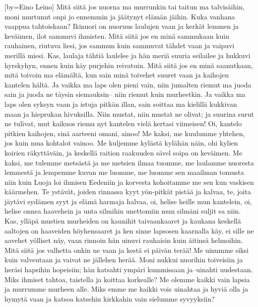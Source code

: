 [by=Eino Leino]
\beginverse
Mitä siitä jos nuorna ma murrunkin
tai taitun ma talvisäihin,
moni murtunut onpi jo ennemmin
ja jäätynyt elämän jäihin.
Kuka vanhana vaappua tahtoiskaan?
Ikinuori on nuoruus laulujen vaan
ja kerkät lemmen ja keväimen,
ilot sammuvi ihmisten.
\endverse
\beginverse
Mitä siitä jos en minä sammukaan
kuin rauhainen, riutuva liesi,
jos sammun kuin sammuvat tähdet vaan
ja vaipuvi merillä miesi.
Kas, laulaja tähtiä laulelee
ja hän meriä suuria seilailee
ja hukkuvi hyrskyhyn, ennen kuin
käy purjehin reivatuin.
\endverse
\beginverse
Mitä siitä jos en minä saanutkaan,
mitä toivoin ma elämältä,
kun sain minä toivehet suuret vaan
ja kaihojen kantelen hältä.
Ja vaikka ma laps olen pieni vain,
niin jumalten riemut ma juoda sain
ja juoda ne täysin siemauksin--
niin riemut kuin murheetkin.
\endverse
\beginverse
Ja vaikka ma laps olen syksyn vaan
ja istuja pitkän illan,
sain soittaa ma kielillä kukkivan maan
ja hieprukan hivuksilla.
Niin mustat, niin mustat ne olivat;
ja suurina surut ne tulivat,
mut kaikuos riemu nyt kantelen
vielä kertasi viimeisen!
\endverse
\beginverse
Oi, kantelo pitkien kaihojen,
sinä aarteeni omani, ainoo!
Me kaksi, me kuulumme yhtehen,
jos kuin mua kohtalot vainoo.
Me kuljemme kylästä kylähän näin,
ohi kylien koirien räkyttäväin,
ja keskellä raition raakuuden
sävel soipa on keväimen.
\endverse
\beginverse
Me kaksi, me tulemme metsästä
ja me metsien ilmaa tuomme,
me laulamme nuoresta lemmestä
ja lempemme kuvan me luomme,
me luomme sen maailman tomusta niin
kuin Luoja loi ihmisen Eedeniin
ja korvesta kohoitamme me sen
kun vaskisen käärmehen.
\endverse
\beginverse
Te ystävät, joiden rinnassa kyyt
yön-pitkät pistää ja kalvaa,
te, joita jäytävi sydämen syyt
ja elämä harmaja halvaa,
oi, helise heille mun kantelein,
oi, helise onnea haavehein
ja unta silmihin unettomiin
mun silmäni suljit sa niin.
Kas, ylläpä mustien murheiden
on kaunihit taivaankaaret
ja kaukana keskellä aaltojen
on haaveiden höyhensaaret
ja ken sinne lapsosen kaarnalla käy,
ei sille ne aavehet yölliset näy,
vaan rinnoin hän uinuvi rauhaisin
kuin äitinsä helmoihin.
\endverse
\beginverse
Mitä siitä jos valhetta onkin ne vaan
ja kestä ei päivän terää!
Me uinumme siksi kuin valveutaan
ja vaivat ne jällehen herää.
Moni nukkui nuorihin toiveisiin
ja heräsi hapsihin hopeisiin;
hän katsahti ympäri kummissaan
ja--uinahti uudestaan.
Miks ihmiset tahtoa, taistella
ja koittaa korkealle?
Me olemme kaikki vain lapsia
ja murrumme murheen alle.
Miks emme me kaikki vois uinahtaa
ja hyviä olla ja hymytä vaan
ja katsoa katsehin kirkkahin
vain sielumme syvyyksiin?
